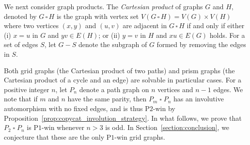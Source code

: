 \documentclass{article}
\theoremstyle{plain}
\theoremstyle{definition}
\def\pone{{\rm{P}\ensuremath{1}}}
\def\ptwo{{\rm{P}\ensuremath{2}}}
\begin{document}
We next consider graph products. The \emph{Cartesian product} of graphs $G$ and $H$, denoted by $G\,\square \,H$ is the graph with vertex set $V(G\,\square \,H) = V(G) \times V(H)$ where two vertices $(x,y)$ and $(u,v)$ are adjacent in $G\,\square \,H$ if and only if either (i) $x=u$ in $G$ and $yv\in E(H)$; or (ii) $y=v$ in $H$ and $xu\in E(G)$ holds. For a set of edges $S$, let $G-S$ denote the subgraph of $G$ formed by removing the edges in $S$.

Both grid graphs (the Cartesian product of two paths) and prism graphs (the Cartesian product of a cycle and an edge) are solvable in particular cases. For a positive integer $n$, let $P_n$ denote a path graph on $n$ vertices and $n-1$ edges. 
We note that if $m$ and $n$ have the same parity, then $P_m \mathbin{\square} P_n$ has an involutive automorphism with no fixed edges, and is thus \ptwo{}-win by Proposition~\ref{prop:copycat_involution_strategy}.
In what follows, we prove that $P_2 \mathbin{\square} P_n$ is \pone{}-win whenever $n > 3$ is odd. In Section~\ref{section:conclusion}, we conjecture that these are the only \pone{}-win grid graphs.
\end{document}
